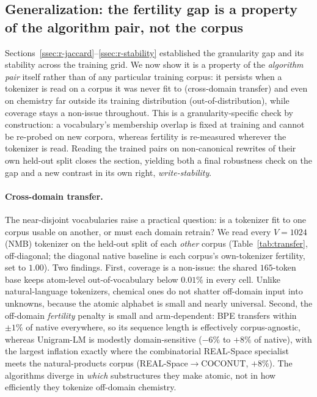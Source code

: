 \documentclass{article}
\begin{document}
\subsection{Generalization: the fertility gap is a property of the
algorithm pair, not the corpus}\label{ssec:r-generalization}



Sections~\ref{ssec:r-jaccard}--\ref{ssec:r-stability} established the granularity
gap and its stability across the training grid. We now show it is a property of
the \emph{algorithm pair} itself rather than of any particular training corpus:
it persists when a tokenizer is read on a corpus it was never fit to
(cross-domain transfer) and even on chemistry far outside its training
distribution (out-of-distribution), while coverage stays a non-issue throughout.
This is a granularity-specific check by construction: a vocabulary's
membership overlap is fixed at training and cannot be re-probed on new corpora,
whereas fertility is re-measured wherever the tokenizer is read. Reading the
trained pairs on non-canonical rewrites of their own held-out split closes the
section, yielding both a final robustness check on the gap and a new contrast in
its own right, \emph{write-stability}.

\paragraph{Cross-domain transfer.}
The near-disjoint vocabularies raise a practical question: is a tokenizer fit
to one corpus usable on another, or must each domain retrain? We read every
$V{=}1024$ (NMB) tokenizer on the held-out split of each \emph{other} corpus
(Table~\ref{tab:transfer}, off-diagonal; the diagonal native baseline is each
corpus's own-tokenizer fertility, set to $1.00$). Two findings. First, coverage
is a non-issue: the shared $165$-token base keeps atom-level out-of-vocabulary
below $0.01\%$ in every cell. Unlike natural-language tokenizers, chemical ones
do not shatter off-domain input into unknowns, because the atomic alphabet is
small and nearly universal. Second, the
off-domain \emph{fertility} penalty is small and arm-dependent: BPE transfers
within $\pm 1\%$ of native everywhere, so its sequence length is effectively
corpus-agnostic, whereas Unigram-LM is modestly domain-sensitive
($-6\%$ to $+8\%$ of native), with the largest inflation exactly where the
combinatorial REAL-Space specialist meets the natural-products corpus
(REAL-Space$\to$COCONUT, $+8\%$). The algorithms diverge in \emph{which}
substructures they make atomic, not in how efficiently they tokenize off-domain
chemistry.
\end{document}
